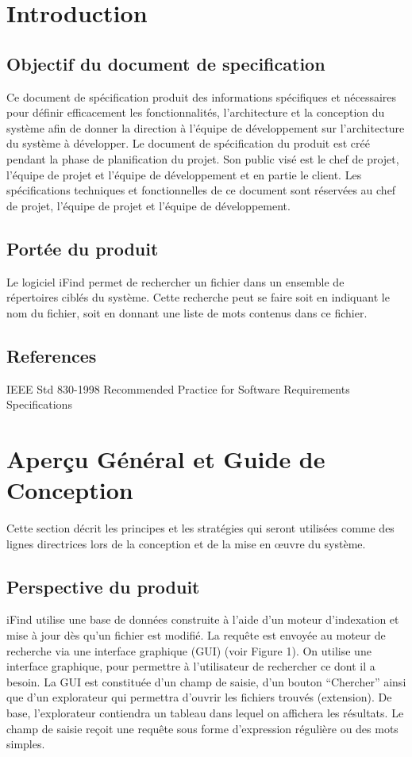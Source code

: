 \section{Introduction}

\subsection{Objectif du document de specification} 
Ce document de spécification produit des informations spécifiques et nécessaires
pour définir efficacement les fonctionnalités, l'architecture et la conception
du système afin de donner la direction à l'équipe de développement sur
l'architecture du système à développer. Le document de spécification du produit
est créé pendant la phase de planification du projet. Son public visé est le
chef de projet, l'équipe de projet et l'équipe de développement et en partie le
client. Les spécifications techniques et fonctionnelles de ce document sont
réservées au chef de projet, l'équipe de projet et l'équipe de développement.


\subsection{Portée du produit}
Le logiciel iFind permet de rechercher un fichier dans un ensemble de\\
répertoires ciblés du système. Cette recherche peut se faire soit en indiquant
le nom du fichier, soit en donnant une liste de mots contenus dans ce fichier.




\subsection{References}
IEEE Std 830-1998 Recommended Practice for Software Requirements Specifications 

\newpage

\section{Aperçu Général et Guide de Conception}
Cette section décrit les principes et les stratégies qui seront utilisées comme
des lignes directrices lors de la conception et de la mise en œuvre du système.

\subsection{Perspective du produit}
iFind utilise une base de données construite à l'aide d'un moteur d'indexation
et mise à jour dès qu'un fichier est modifié. La requête est envoyée au moteur
de recherche via une interface graphique (GUI) (voir Figure 1). On utilise une
interface graphique, pour permettre à l’utilisateur de rechercher ce dont il a
besoin. La GUI est constituée d’un champ de saisie, d’un bouton “Chercher” ainsi
que d’un explorateur qui permettra d’ouvrir les fichiers trouvés (extension). De
base, l’explorateur contiendra un tableau dans lequel on affichera les
résultats. Le champ de saisie reçoit une requête sous forme d’expression
régulière ou des mots simples.

